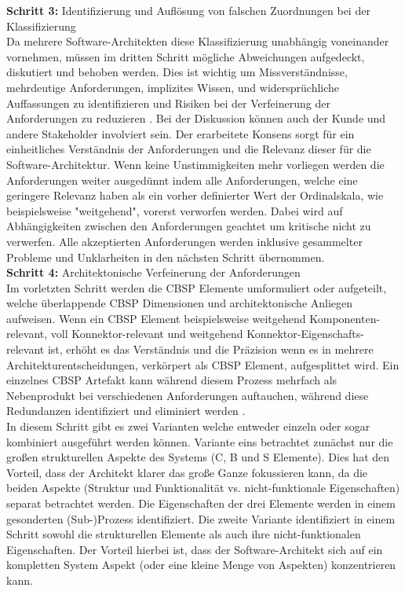 \textbf{Schritt 3:} Identifizierung und Auflösung von falschen Zuordnungen bei der Klassifizierung \\
Da mehrere Software-Architekten diese Klassifizierung unabhängig voneinander vornehmen, müssen im dritten Schritt mögliche Abweichungen aufgedeckt, diskutiert und behoben werden. Dies ist wichtig um Missverständnisse, mehrdeutige Anforderungen, implizites Wissen, und widersprüchliche Auffassungen zu identifizieren und Risiken bei der Verfeinerung der Anforderungen zu reduzieren \cite{Gru01}. Bei der Diskussion können auch der Kunde und andere Stakeholder involviert sein. Der erarbeitete Konsens sorgt für ein einheitliches Verständnis der Anforderungen und die Relevanz dieser für die Software-Architektur. Wenn keine Unstimmigkeiten mehr vorliegen werden die Anforderungen weiter ausgedünnt indem alle Anforderungen, welche eine geringere Relevanz haben als ein vorher definierter Wert der Ordinalskala, wie beispielsweise "weitgehend", vorerst verworfen werden. Dabei wird auf Abhängigkeiten zwischen den Anforderungen geachtet um kritische nicht zu verwerfen. Alle akzeptierten Anforderungen werden inklusive gesammelter Probleme und Unklarheiten in den nächsten Schritt übernommen. \\

\textbf{Schritt 4:} Architektonische Verfeinerung der Anforderungen \\
Im vorletzten Schritt werden die CBSP Elemente umformuliert oder aufgeteilt, welche überlappende CBSP Dimensionen und architektonische Anliegen aufweisen. Wenn ein CBSP Element beispielsweise weitgehend Komponenten-relevant, voll Konnektor-relevant und weitgehend Konnektor-Eigenschafts-relevant ist, erhöht es das Verständnis und die Präzision wenn es in mehrere Architekturentscheidungen, verkörpert als CBSP Element, aufgesplittet wird. Ein einzelnes CBSP Artefakt kann während diesem Prozess mehrfach als Nebenprodukt bei verschiedenen Anforderungen auftauchen, während diese Redundanzen identifiziert und eliminiert werden \cite{Gru01}. \\
In diesem Schritt gibt es zwei Varianten welche entweder einzeln oder sogar kombiniert ausgeführt werden können. Variante eins betrachtet zunächst nur die großen strukturellen Aspekte des Systems (C, B und S Elemente). Dies hat den Vorteil, dass der Architekt klarer das große Ganze fokussieren kann, da die beiden Aspekte (Struktur und Funktionalität vs. nicht-funktionale Eigenschaften) separat betrachtet werden. Die Eigenschaften der drei Elemente werden in einem gesonderten (Sub-)Prozess identifiziert. Die zweite Variante identifiziert in einem Schritt sowohl die strukturellen Elemente als auch ihre nicht-funktionalen Eigenschaften. Der Vorteil hierbei ist, dass der Software-Architekt sich auf ein kompletten System Aspekt (oder eine kleine Menge von Aspekten) konzentrieren kann. \\

